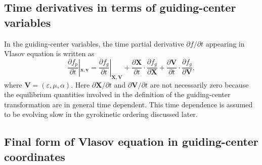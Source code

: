 \documentclass{article}
\newcommand{\nobracket}{}
\begin{document}
\subsection{Time derivatives in terms of guiding-center variables}

In the guiding-center variables, the time partial derivative $\partial f /
\partial t$ appearing in Vlasov equation is written as
\begin{equation}
  \frac{\partial f_p}{\partial t} |_{\mathbf{x}, \mathbf{v}} \nobracket =
  \frac{\partial f_g}{\partial t} |_{\mathbf{X}, \mathbf{V}} \nobracket +
  \frac{\partial \mathbf{X}}{\partial t} \cdot \frac{\partial f_g}{\partial
  \mathbf{X}} + \frac{\partial \mathbf{V}}{\partial t} \cdot \frac{\partial
  f_g}{\partial \mathbf{V}},
\end{equation}
where $\mathbf{V}= (\varepsilon, \mu, \alpha)$. Here $\partial \mathbf{X}/
\partial t$ and $\partial \mathbf{V}/ \partial t$ are not necessarily zero
because the equilibrium quantities involved in the definition of the
guiding-center transformation are in general time dependent. This time
dependence is assumed to be evolving slow in the gyrokinetic ordering
discussed later.

\subsection{Final form of Vlasov equation in guiding-center coordinates}
\end{document}
